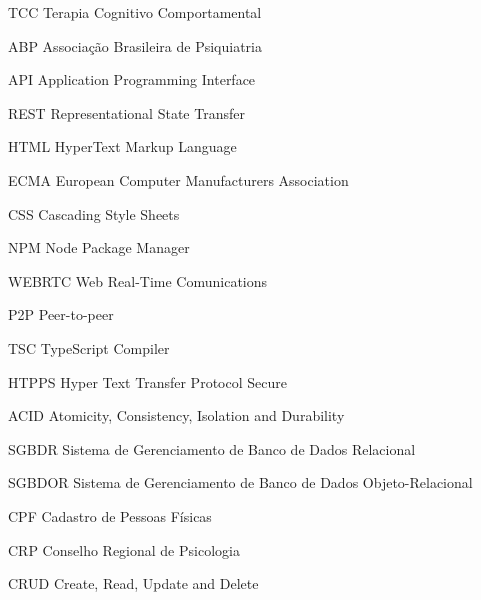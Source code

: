 \begin{siglas}
    \item[TCC] Terapia Cognitivo Comportamental
    \item[ABP] Associação Brasileira de Psiquiatria 
    \item[API] Application Programming Interface
    \item[REST] Representational State Transfer
    \item[HTML] HyperText Markup Language
    \item[ECMA] European Computer Manufacturers Association
    \item[CSS] Cascading Style Sheets 
    \item[NPM] Node Package Manager
    \item[WEBRTC] Web Real-Time Comunications
    \item[P2P] Peer-to-peer
    \item[TSC] TypeScript Compiler
    \item[HTPPS] Hyper Text Transfer Protocol Secure
    \item[ACID] Atomicity, Consistency, Isolation and Durability
    \item[SGBDR] Sistema de Gerenciamento de Banco de Dados Relacional   
    \item[SGBDOR] Sistema de Gerenciamento de Banco de Dados Objeto-Relacional  
    \item[CPF] Cadastro de Pessoas Físicas
    \item[CRP] Conselho Regional de Psicologia 
    \item[CRUD] Create, Read, Update and Delete
\end{siglas}
